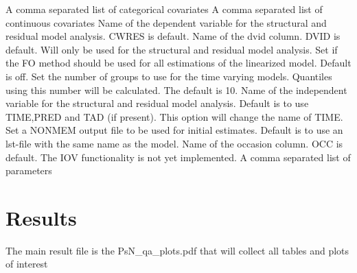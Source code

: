 \begin{optionlist}
A comma separated list of categorical covariates
\nextopt
{}
A comma separated list of continuous covariates
\nextopt
{}
Name of the dependent variable for the structural and residual model analysis. CWRES is default.
\nextopt
{}
Name of the dvid column. DVID is default.
Will only be used for the structural and residual model analysis.
\nextopt
{}
Set if the FO method should be used for all estimations
of the linearized model. Default is off.
\nextopt
{}
Set the number of groups to use for the time varying models.
Quantiles using this number will be calculated.
The default is 10.
\nextopt
{}
Name of the independent variable for the structural and residual model analysis.
Default is to use TIME,PRED and TAD (if present). This option will change the name
of TIME.
\nextopt
{}
Set a NONMEM output file to be used for initial estimates.
Default is to use an lst-file with the same name as the model.
\nextopt
{}
Name of the occasion column. OCC is default.
The IOV functionality is not yet implemented.
\nextopt
{}
A comma separated list of parameters
\nextopt
\end{optionlist}


\section{Results}

The main result file is the PsN\_qa\_plots.pdf that will collect all tables and plots of interest



